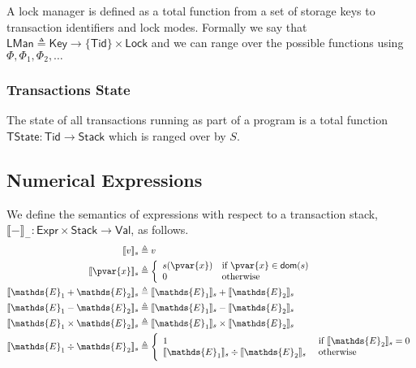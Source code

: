 A lock manager is defined as a total function from a set of storage keys to transaction identifiers and lock modes. Formally we say that $\mathsf{LMan} \triangleq \mathsf{Key} \rightarrow \{ \mathsf{Tid} \} \times \mathsf{Lock}$ and we can range over the possible functions using $\Phi, \Phi_1, \Phi_2, \ldots$

\subsubsection{Transactions State}

The state of all transactions running as part of a program is a total function $\mathsf{TState} : \mathsf{Tid} \rightarrow \mathsf{Stack}$ which is ranged over by $S$.

\subsection{Numerical Expressions}

We define the semantics of expressions with respect to a transaction stack, $\llbracket - \rrbracket_- : \mathsf{Expr} \times \mathsf{Stack} \rightarrow \mathsf{Val}$, as follows.
\begin{align*}
\llbracket v \rrbracket_s &\triangleq v \\
\llbracket \pvar{x} \rrbracket_s &\triangleq
\bigg\{ \begin{array}{l l}
s(\pvar{x}) &\text{if } \pvar{x} \in \textsf{dom}(s)\\
0&\text{otherwise}
\end{array} \\
\llbracket \mathds{E}_1 + \mathds{E}_2 \rrbracket_s &\triangleq \llbracket \mathds{E}_1 \rrbracket_s + \llbracket \mathds{E}_2 \rrbracket_s \\
\llbracket \mathds{E}_1 - \mathds{E}_2 \rrbracket_s &\triangleq \llbracket \mathds{E}_1 \rrbracket_s - \llbracket \mathds{E}_2 \rrbracket_s \\
\llbracket \mathds{E}_1 \times \mathds{E}_2 \rrbracket_s &\triangleq \llbracket \mathds{E}_1 \rrbracket_s \times \llbracket \mathds{E}_2 \rrbracket_s \\
\llbracket \mathds{E}_1 \div \mathds{E}_2 \rrbracket_s &\triangleq 
\Bigg\{ \begin{array}{l l}
1 &\text{ if } \llbracket \mathds{E}_2 \rrbracket_s = 0 \\
\llbracket \mathds{E}_1 \rrbracket_s \div \llbracket \mathds{E}_2 \rrbracket_s &\text{ otherwise} \\
\end{array}
\end{align*}


